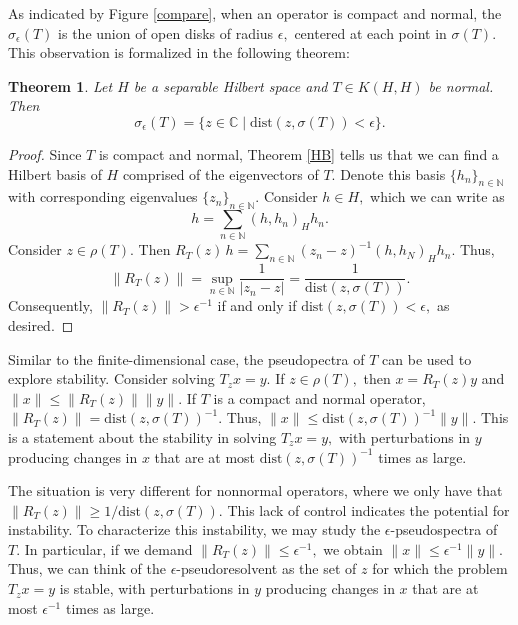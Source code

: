 \documentclass[12pt,a4paper]{article}
\theoremstyle{boldthm}
\newtheorem{theorem}{Theorem}[section]
\theoremstyle{bolddefn}
\begin{document}
As indicated by Figure \ref{compare}, when an operator is compact and normal, the $\sigma_{\epsilon}(T)$ is the union of open disks of radius $\epsilon,$ centered at each point in $\sigma(T).$ This observation is formalized in the following theorem:
\begin{theorem}
    Let $H$ be a separable Hilbert space and $T \in K(H, H)$ be normal. Then 
    \begin{equation}
        \sigma_{\epsilon}(T) = \{ z \in \mathbb{C} \mid \text{dist}(z, \sigma(T)) < \epsilon \}.
    \end{equation}
\end{theorem}
\begin{proof}
    Since $T$ is compact and normal, Theorem \ref{HB} tells us that we can find a Hilbert basis of $H$ comprised of the eigenvectors of $T.$ Denote this basis $\{h_n \}_{n \in \mathbb{N}}$ with corresponding eigenvalues $\{z_n\}_{n \in \mathbb{N}}.$ Consider $h \in H,$ which we can write as 
    \begin{equation}
        h = \sum_{n \in \mathbb{N}} (h, h_n)_H h_n.
    \end{equation}
    Consider $z \in \rho(T).$ Then $R_T(z) \,h =  \sum_{n \in \mathbb{N}} (z_n - z)^{-1} (h, h_N)_H h_n.$ Thus, 
    \begin{equation}
        \| R_T(z) \| = \sup_{n \in \mathbb{N}} \frac{1}{|z_n - z|} = \frac{1}{\text{dist}(z, \sigma(T))}.
     \end{equation}
     Consequently, $\| R_T(z) \| > \epsilon^{-1} $ if and only if $\text{dist}(z, \sigma(T)) < \epsilon,$ as desired.
\end{proof}


Similar to the finite-dimensional case, the pseudopectra of $T$ can be used to explore stability. Consider solving $T_z x = y.$ If $z \in \rho(T),$ then $x = R_T(z) y$  and $\|x \| \le \|R_T(z) \| \| y \|.$ 
If $T$ is a compact and normal operator, $\| R_T(z) \| = \text{dist}(z, \sigma(T))^{-1}.$ Thus, $\| x \| \le \text{dist}(z, \sigma(T))^{-1} \|y \|.$ This is a statement about the stability in solving $T_z x = y,$  with perturbations in $y$ producing changes in $x$ that are at most
$\text{dist}(z,\sigma(T))^{-1}$ times as large.

The situation is very different for nonnormal operators, where we only have that $\| R_T(z) \| \ge 1 / \text{dist}(z, \sigma(T)).$ This lack of control indicates the potential for instability. To characterize this instability, we may study the $\epsilon$-pseudospectra of $T.$ 
In particular, if we demand $\| R_T(z) \| \le \epsilon^{-1},$ we obtain $\| x \| \le \epsilon^{-1} \| y \|.$ Thus, we can think of the $\epsilon$-pseudoresolvent as the set of $z$ for which the problem $T_z x  = y$ is stable, with perturbations in $y$ producing changes in $x$ that are at most
$\epsilon^{-1}$ times as large.
\end{document}
